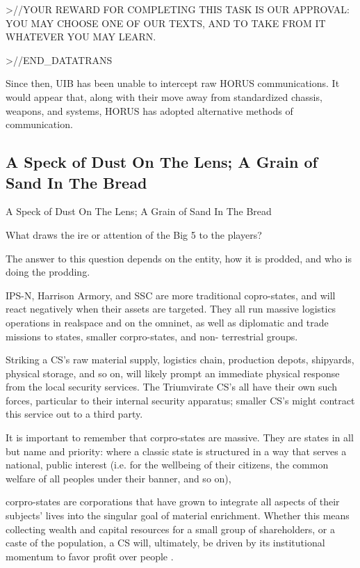                   >//YOUR REWARD FOR COMPLETING THIS TASK IS OUR APPROVAL: YOU MAY  
                  CHOOSE ONE OF OUR TEXTS, AND TO TAKE FROM IT WHATEVER YOU MAY LEARN. 
 

                  >//END\_DATATRANS
 

Since then, UIB has been unable to intercept raw HORUS communications. It would appear  
that, along with their move away from standardized chassis, weapons, and systems, HORUS  
has adopted alternative methods of communication.    
\subsection{A Speck of Dust On The Lens; A Grain of Sand In The Bread  }
A Speck of Dust On The Lens; A Grain of Sand In The Bread  
   
What draws the ire or attention of the Big 5 to the players?   

The answer to this question depends on the entity, how it is prodded, and who is doing the  
prodding.   

IPS-N, Harrison Armory, and SSC are more traditional copro-states, and will react negatively  
when their assets are targeted. They all run massive logistics operations in realspace and on the  
omninet, as well as diplomatic and trade missions to states, smaller corpro-states, and non- 
terrestrial groups.   

Striking a CS’s raw material supply, logistics chain, production depots, shipyards, physical  
storage, and so on, will likely prompt an immediate physical response from the local security  
services. The Triumvirate CS’s all have their own such forces, particular to their internal security  
apparatus; smaller CS’s might contract this service out to a third party.   

It is important to remember that corpro-states are massive. They are states in all but name and  
priority: where a classic state is structured in a way that serves a national, public interest (i.e. for  
the wellbeing of their citizens, the common welfare of all peoples under their banner, and so on),  

                                                                                                                  


corpro-states are corporations that have grown to integrate all aspects of their subjects’ lives into  
the singular goal of material enrichment. Whether this means collecting wealth and capital  
resources for a small group of shareholders, or a caste of the population, a CS will, ultimately, be  
driven by its institutional momentum to favor profit over people .   

